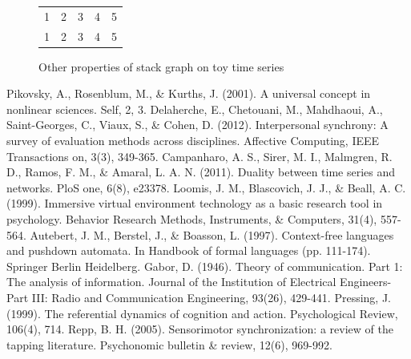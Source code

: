 \documentclass[12pt]{article}
\begin{document}
\begin{figure}\label{fig:stack_ts_others}
  \begin{tabular} {c | c c c c}
    1 & 2 & 3 & 4 & 5 \\ %
    1 & 2 & 3 & 4 & 5 \\ %
  \end{tabular}
  \caption{Other properties of stack graph on toy time series}
\end{figure}


\begin{thebibliography}{}
    Pikovsky, A., Rosenblum, M., \& Kurths, J. (2001). A universal concept in nonlinear sciences. Self, 2, 3.
    Delaherche, E., Chetouani, M., Mahdhaoui, A., Saint-Georges, C., Viaux, S., \& Cohen, D. (2012). Interpersonal synchrony: A survey of evaluation methods across disciplines. Affective Computing, IEEE Transactions on, 3(3), 349-365.
    Campanharo, A. S., Sirer, M. I., Malmgren, R. D., Ramos, F. M., \& Amaral, L. A. N. (2011). Duality between time series and networks. PloS one, 6(8), e23378.
    Loomis, J. M., Blascovich, J. J., \& Beall, A. C. (1999). Immersive virtual environment technology as a basic research tool in psychology. Behavior Research Methods, Instruments, \& Computers, 31(4), 557-564.
    Autebert, J. M., Berstel, J., \& Boasson, L. (1997). Context-free languages and pushdown automata. In Handbook of formal languages (pp. 111-174). Springer Berlin Heidelberg.
    Gabor, D. (1946). Theory of communication. Part 1: The analysis of information. Journal of the Institution of Electrical Engineers-Part III: Radio and Communication Engineering, 93(26), 429-441.
    Pressing, J. (1999). The referential dynamics of cognition and action. Psychological Review, 106(4), 714.
    Repp, B. H. (2005). Sensorimotor synchronization: a review of the tapping literature. Psychonomic bulletin \& review, 12(6), 969-992.

\end{thebibliography}
\end{document}
